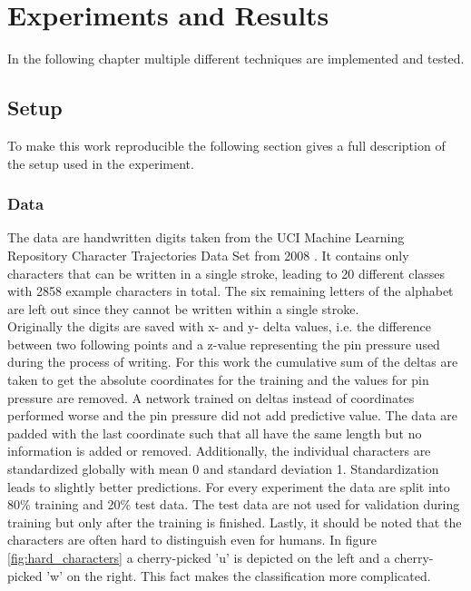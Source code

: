 \chapter{Experiments and Results}
\label{chap:Experiments}

In the following chapter multiple different techniques are implemented and tested.

\section{Setup}

To make this work reproducible the following section gives a full description of the setup used in the experiment.

\subsection{Data}
	The data are handwritten digits taken from the UCI Machine Learning Repository Character Trajectories Data Set from 2008 \cite{uci2013}. 
	It contains only characters that can be written in a single stroke, leading to 20 different classes with 2858 example characters in total. The six remaining letters of the alphabet are left out since they cannot be written within a single stroke. \\
	Originally the digits are saved with x- and y- delta values, i.e. the difference between two following points and a z-value representing the pin pressure used during the process of writing. For this work the cumulative sum of the deltas are taken to get the absolute coordinates for the training and the values for pin pressure are removed. A network trained on deltas instead of coordinates performed worse and the pin pressure did not add predictive value.
	The data are padded with the last coordinate such that all have the same length but no information is added or removed. 
	Additionally, the individual characters are standardized globally with mean 0 and standard deviation 1. Standardization leads to slightly better predictions. 
	For every experiment the data are split into 80\% training and 20\% test data. The test data are not used for validation during training but only after the training is finished.
	Lastly, it should be noted that the characters are often hard to distinguish even for humans. In figure	\ref{fig:hard_characters}
	a cherry-picked 'u' is depicted on the left and a cherry-picked 'w' on the right. This fact makes the classification more complicated. 
	
